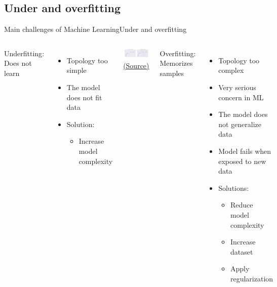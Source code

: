 \documentclass[10pt,compress]{beamer} %
\begin{document}
\subsection{Under and overfitting}
\begin{frame}{Main challenges of Machine Learning}{Under and overfitting}
    \begin{columns}
		\alert{Underfitting}: Does not learn
            \begin{itemize}
                \item Topology too simple
				\item The model does not fit data
				\item Solution: 
				\begin{itemize}
					\item Increase model complexity
				\end{itemize}
            \end{itemize}

            \begin{center}
			\includegraphics[width=\linewidth]{figs/05.03-bias-variance.png}\\
			\scriptsize \href{https://jakevdp.github.io/PythonDataScienceHandbook/05.03-hyperparameters-and-model-validation.html}{(Source)}
            \end{center}

		\alert{Overfitting}: Memorizes samples
            \begin{itemize}
                \item Topology too complex
                \item Very serious concern in ML
				\item The model does not generalize data
                \item Model fails when exposed to new data
				\item Solutions:
				\begin{itemize}
					\item Reduce model complexity
					\item Increase dataset
					\item Apply regularization
				\end{itemize}
            \end{itemize}
   \end{columns}
\end{frame}
\end{document}
